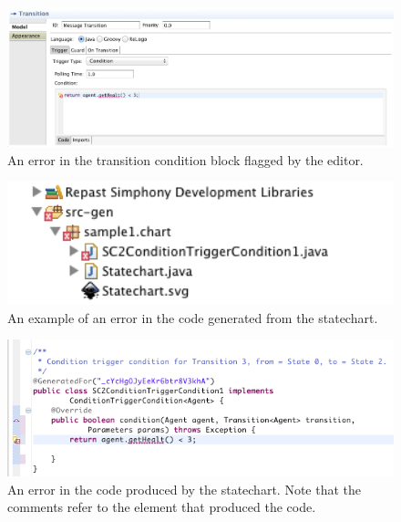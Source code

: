 \documentclass[11pt]{amsart}
\begin{document}
\begin{figure}
\begin{center}
\vspace{.2in}
\centerline {
\includegraphics[width=5.5in]{StatechartsImages/code_editor_error.png}
}
\caption{An error in the transition condition block flagged by the editor.}
\label{fig:editorcodeerror}
\end{center}
\end{figure}


\begin{figure}
\begin{center}
\vspace{.2in}
\centerline {
\includegraphics[width=5in]{StatechartsImages/srcgen_error.png}
}
\caption{An example of an error in the code generated from the statechart.}
\label{fig:srcgen}
\end{center}
\end{figure}

\begin{figure}
\begin{center}
\vspace{.2in}
\centerline {
\includegraphics[width=5.5in]{StatechartsImages/code_error.png}
}
\caption{An error in the code produced by the statechart. Note that the comments refer to the element that produced the code.}
\label{fig:codeerror}
\end{center}
\end{figure}
\end{document}
